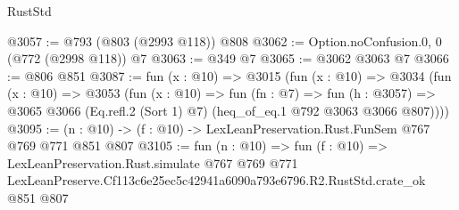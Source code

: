 \begin{lexlean}{RustStd}
\begin{coremodule}
@3057 := @793 (@803 (@2993 @118)) @808
@3062 := Option.noConfusion.{0, 0} (@772 (@2998 @118)) @7
@3063 := @349 @7
@3065 := @3062 @3063 @7
@3066 := @806 @851
@3087 := fun (x : @10) =>
  @3015
    (fun (x : @10) =>
    @3034
      (fun (x : @10) =>
      @3053
        (fun (x : @10) =>
        fun (fn : @7) =>
        fun (h : @3057) =>
        @3065 @3066 (Eq.refl.{2} (Sort 1) @7) (heq_of_eq.{1} @792 @3063 @3066 @807))))
@3095 := (n : @10) -> (f : @10) -> LexLeanPreservation.Rust.FunSem @767 @769 @771 @851 @807
@3105 := fun (n : @10) =>
  fun (f : @10) =>
  LexLeanPreservation.Rust.simulate
    @767
    @769
    @771
    LexLeanPreserve.Cf113c6e25ec5c42941a6090a793e6796.R2.RustStd.crate_ok
    @851
    @807
\end{coremodule}
\end{lexlean}

